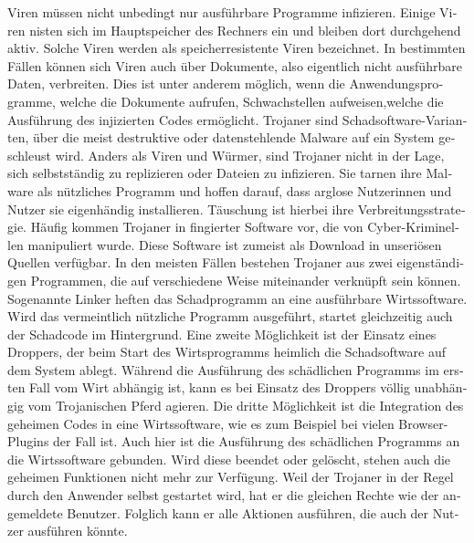 \begin{otherlanguage}{ngerman}
    Viren müssen nicht unbedingt nur ausführbare Programme infizieren. Einige Viren nisten sich
    im Hauptspeicher des Rechners ein und bleiben dort durchgehend aktiv. Solche Viren werden als \dq speicherresistente\dq{} Viren bezeichnet. 
    \newline In bestimmten Fällen können sich Viren auch über Dokumente, also eigentlich nicht ausführbare Daten, verbreiten. Dies ist unter anderem möglich, wenn die Anwendungsprogramme, welche die Dokumente aufrufen, Schwachstellen aufweisen,welche die Ausführung des injizierten Codes ermöglicht.
    \newline Trojaner sind  Schadsoftware-Varianten, über die meist destruktive oder datenstehlende Malware auf ein System geschleust wird. Anders als Viren und Würmer, sind Trojaner nicht in der Lage, sich selbstständig zu replizieren oder Dateien zu infizieren.
    Sie tarnen ihre Malware als nützliches Programm und hoffen darauf, dass arglose Nutzerinnen und Nutzer sie eigenhändig installieren. Täuschung ist hierbei ihre Verbreitungsstrategie. Häufig kommen Trojaner in fingierter Software vor, die von Cyber-Kriminellen manipuliert wurde. Diese Software ist zumeist als Download in unseriösen Quellen verfügbar.
    \newline In den meisten Fällen bestehen Trojaner aus zwei eigenständigen Programmen, die auf verschiedene Weise miteinander verknüpft sein können. Sogenannte Linker heften das Schadprogramm an eine ausführbare Wirtssoftware. Wird das vermeintlich nützliche Programm ausgeführt, startet gleichzeitig auch der Schadcode im Hintergrund.
    \newline Eine zweite Möglichkeit ist der Einsatz eines Droppers, der beim Start des Wirtsprogramms heimlich die Schadsoftware auf dem System ablegt. Während die Ausführung des schädlichen Programms im ersten Fall vom Wirt abhängig ist, kann es bei Einsatz des Droppers völlig unabhängig vom Trojanischen Pferd agieren. 
    \newline Die dritte Möglichkeit ist die Integration des geheimen Codes in eine Wirtssoftware, wie es zum Beispiel bei vielen Browser-Plugins der Fall ist. Auch hier ist die Ausführung des schädlichen Programms an die Wirtssoftware gebunden. Wird diese beendet oder gelöscht, stehen auch die geheimen Funktionen nicht mehr zur Verfügung.
    \newline Weil der Trojaner in der Regel durch den Anwender selbst gestartet wird, hat er die gleichen Rechte wie der angemeldete Benutzer. Folglich kann er alle Aktionen ausführen, die auch der Nutzer ausführen könnte.
    

\end{otherlanguage}
